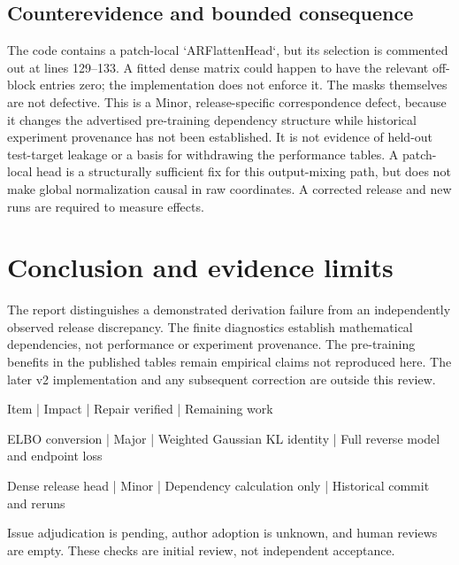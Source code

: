 \documentclass[10pt]{article}
\begin{document}
\subsection*{Counterevidence and bounded consequence}
The code contains a patch-local `ARFlattenHead`, but its selection is commented out at lines 129–133. A fitted dense matrix could happen to have the relevant off-block entries zero; the implementation does not enforce it. The masks themselves are not defective. This is a Minor, release-specific correspondence defect, because it changes the advertised pre-training dependency structure while historical experiment provenance has not been established. It is not evidence of held-out test-target leakage or a basis for withdrawing the performance tables. A patch-local head is a structurally sufficient fix for this output-mixing path, but does not make global normalization causal in raw coordinates. A corrected release and new runs are required to measure effects.\par
\section*{Conclusion and evidence limits}
The report distinguishes a demonstrated derivation failure from an independently observed release discrepancy. The finite diagnostics establish mathematical dependencies, not performance or experiment provenance. The pre-training benefits in the published tables remain empirical claims not reproduced here. The later v2 implementation and any subsequent correction are outside this review.\par
Item | Impact | Repair verified | Remaining work\par
ELBO conversion | Major | Weighted Gaussian KL identity | Full reverse model and endpoint loss\par
Dense release head | Minor | Dependency calculation only | Historical commit and reruns\par
Issue adjudication is pending, author adoption is unknown, and human reviews are empty. These checks are initial review, not independent acceptance.\par
\end{document}
